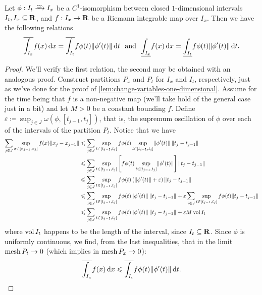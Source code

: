 \begin{corollary}
    \label{cor:C1-isomorphism-intervals-upper-lower-integral}
    Let \(\phi: I_t \isoto I_x\) be a \(C^1\)-isomorphism between closed
    \(1\)-dimensional intervals \(I_t, I_x \subseteq \mathbf{R}\), and \(f: I_x \to \mathbf{R}\) be
    a Riemann integrable map over \(I_{x}\). Then we have the following relations
    \[
        \overline{\int_{I_x}} f(x)\, \mathrm{d} x
        = \overline{\int_{I_t}} f \phi(t) \lVert\phi'(t)\rVert\, \mathrm{d} t
        \ \text{ and }\
        \underline{\int_{I_x}} f(x)\, \mathrm{d} x
        = \underline{\int_{I_t}} f \phi(t) \lVert\phi'(t)\rVert\, \mathrm{d} t.
    \]
\end{corollary}

\begin{proof}
    We'll verify the first relation, the second may be obtained with an analogous
    proof. Construct partitions \(P_x\) and \(P_t\) for \(I_x\) and \(I_t\),
    respectively, just as we've done for the proof of
    \cref{lem:change-variables-one-dimensional}. Assume for the time being that
    \(f\) is a non-negative map (we'll take hold of the general case just in a
    bit) and let \(M > 0\) be a constant bounding \(f\). Define \(\varepsilon
    \coloneq \sup_{j \in J} \omega(\phi, [t_{j-1}, t_j])\), that is, the supremum
    oscillation of \(\phi\) over each of the intervals of the partition
    \(P_t\). Notice that we have
        {\footnotesize%
            \begin{align*}
                \sum_{j \in J} \sup_{x \in [x_{j-1}, x_j]} f(x) \lVert x_j - x_{j-1}\rVert
                 & \leqslant \sum_{j \in J} \sup_{t \in [t_{j-1}, t_j]} f \phi(t)
                \sup_{t \in [t_{j-1}, t_j]} \lVert\phi'(t)\rVert\, \lVert t_j - t_{j-1}\rVert \\
                 & \leqslant \sum_{j \in J} \sup_{t \in [t_{j-1}, t_j]}
                \left[
                    f \phi(t) \sup_{t \in [t_{j-1}, t_j]} \lVert\phi'(t)\rVert
                    \right]
                \lVert t_j - t_{j-1}\rVert                                               \\
                 & \leqslant \sum_{j \in J} \sup_{t \in [t_{j-1}, t_j]}
                f \phi(t) \left( \lVert\phi'(t)\rVert + \varepsilon \right)
                \lVert t_j - t_{j-1}\rVert                                               \\
                 & \leqslant \sum_{j \in J} \sup_{t \in [t_{j-1}, t_j]}
                f \phi(t) \lVert\phi'(t)\rVert\, \lVert t_j - t_{j-1}\rVert
                + \varepsilon \sum_{j \in J} \sup_{t \in [t_{j-1}, t_j]}
                f\phi(t) \lVert t_j - t_{j-1}\rVert                                      \\
                 & \leqslant \sum_{j \in J} \sup_{t \in [t_{j-1}, t_j]}
                f \phi(t) \lVert\phi'(t)\rVert\, \lVert t_j - t_{j-1}\rVert
                + \varepsilon M \operatorname{vol} I_t
            \end{align*}
        }%
    where \(\operatorname{vol} I_t\) happens to be the length of the interval, since \(I_t
    \subseteq \mathbf{R}\). Since \(\phi\) is uniformly continuous, we find, from the last
    inequalities, that in the limit \(\operatorname{mesh} P_t \to 0\) (which implies in \(\operatorname{mesh}
    P_x \to 0\)):
    \[
        \overline{\int_{I_x}} f(x)\, \mathrm{d} x
        \leqslant \overline{\int_{I_t}} f \phi(t) \lVert\phi'(t)\rVert\, \mathrm{d} t.
    \]


\end{proof}
